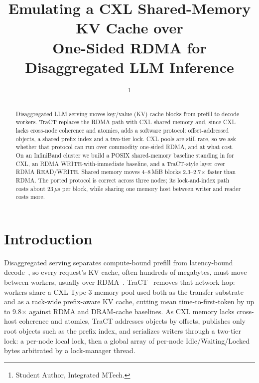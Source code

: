 \documentclass[conference]{IEEEtran}
\begin{document}
\raggedbottom

\title{Emulating a CXL Shared-Memory KV Cache over\\ One-Sided RDMA for Disaggregated LLM Inference}

\author{
\thanks{Student Author, Integrated MTech.}}

\maketitle

\begin{abstract}
Disaggregated LLM serving moves key/value (KV) cache blocks from prefill to decode workers. TraCT replaces the RDMA path with CXL shared memory and, since CXL lacks cross-node coherence and atomics, adds a software protocol: offset-addressed objects, a shared prefix index and a two-tier lock. CXL pools are still rare, so we ask whether that protocol can run over commodity one-sided RDMA, and at what cost. On an InfiniBand cluster we build a POSIX shared-memory baseline standing in for CXL, an RDMA WRITE-with-immediate baseline, and a TraCT-style layer over RDMA READ/WRITE. Shared memory moves 4--8\,MiB blocks 2.3--2.7$\times$ faster than RDMA. The ported protocol is correct across three nodes; its lock-and-index path costs about 23\,$\mu$s per block, while sharing one memory host between writer and reader costs more.
\end{abstract}

\section{Introduction}
Disaggregated serving separates compute-bound prefill from latency-bound decode~\cite{distserve}, so every request's KV cache, often hundreds of megabytes, must move between workers, usually over RDMA~\cite{mooncake}. TraCT~\cite{tract} removes that network hop: workers share a CXL Type-3 memory pool used both as the transfer substrate and as a rack-wide prefix-aware KV cache, cutting mean time-to-first-token by up to 9.8$\times$ against RDMA and DRAM-cache baselines. As CXL memory lacks cross-host coherence and atomics, TraCT addresses objects by offsets, publishes only root objects such as the prefix index, and serializes writers through a two-tier lock: a per-node local lock, then a global array of per-node Idle/Waiting/Locked bytes arbitrated by a lock-manager thread.
\end{document}
